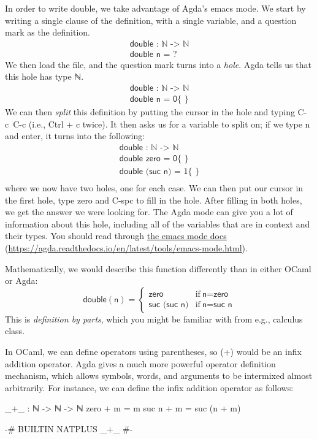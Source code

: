 \documentclass{lecturenotes}
\begin{document}
In order to write \textsf{double}, we take advantage of Agda's emacs mode.
We start by writing a single clause of the definition, with a single variable, and a question mark as the definition.
$$
\begin{array}{l}
  \textsf{double : ℕ -> ℕ}\\
  \textsf{double n = ?}
\end{array}
$$
We then load the file, and the question mark turns into a \emph{hole}.
Agda tells us that this hole has type \textsf{ℕ}.
$$
\begin{array}{l}
  \textsf{double : ℕ -> ℕ}\\
  \textsf{double n = 0\{~\}}
\end{array}
$$
We can then \emph{split} this definition by putting the cursor in the hole and typing \textsf{C-c~C-c} (i.e., \textsf{Ctrl + c} twice).
It then asks us for a variable to split on; if we type \textsf{n} and enter, it turns into the following:
$$
\begin{array}{l}
  \textsf{double : ℕ -> ℕ}\\
  \textsf{double zero = 0\{~\}}\\
  \textsf{double (suc n) = 1\{~\}}\\
\end{array}
$$
where we now have two holes, one for each case.
We can then put our cursor in the first hole, type \textsf{zero} and \textsf{C-spc} to fill in the hole.
After filling in both holes, we get the answer we were looking for.
The Agda mode can give you a lot of information about this hole, including all of the variables that are in context and their types.
You should read through \href{https://agda.readthedocs.io/en/latest/tools/emacs-mode.html}{the emacs mode docs} (\url{https://agda.readthedocs.io/en/latest/tools/emacs-mode.html}).

Mathematically, we would describe this function differently than in either OCaml or Agda:
$$
\textsf{double}(\textsf{n}) = \left\{\begin{array}{ll}
  \textsf{zero} & \text{if}~\textsf{n}=\textsf{zero}\\
  \textsf{suc (suc n)} & \text{if}~\textsf{n}=\textsf{suc n}
\end{array}\right.
$$
This is \emph{definition by parts}, which you might be familiar with from e.g., calculus class.

In OCaml, we can define operators using parentheses, so \textsf{(+)} would be an infix addition operator.
Agda gives a much more powerful operator definition mechanism, which allows symbols, words, and arguments to be intermixed almost arbitrarily.
For instance, we can define the infix addition operator as follows:
\begin{center}
\begin{code}
  _+_ : ℕ -> ℕ -> ℕ
  zero + m = m
  suc n + m = suc (n + m)

  {-# BUILTIN NATPLUS _+_ #-}
\end{code}
\end{center}
\end{document}
